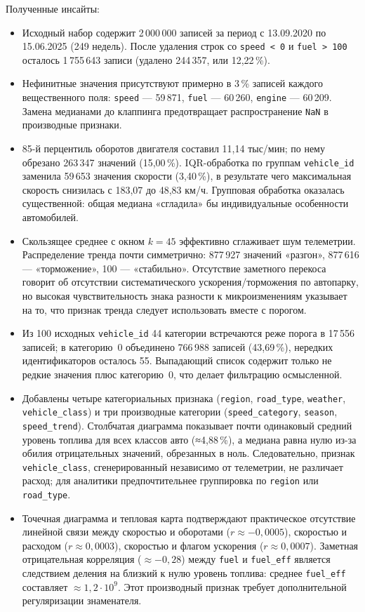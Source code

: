 \documentclass[oneside,a4paper,14pt]{extarticle}
\begin{document}
Полученные инсайты:
\begin{itemize}[leftmargin=*]
	\item Исходный набор содержит 2\,000\,000 записей за период с 13.09.2020 по 15.06.2025 (249 недель). После удаления строк со \texttt{speed < 0} и \texttt{fuel > 100} осталось 1\,755\,643 записи (удалено 244\,357, или 12,22\,\%).
	\item Нефинитные значения присутствуют примерно в 3\,\% записей каждого вещественного поля: \texttt{speed} --- 59\,871, \texttt{fuel} --- 60\,260, \texttt{engine} --- 60\,209. Замена медианами до клаппинга предотвращает распространение \texttt{NaN} в производные признаки.
	\item 85-й перцентиль оборотов двигателя составил 11,14 тыс/мин; по нему обрезано 263\,347 значений (15,00\,\%). IQR-обработка по группам \texttt{vehicle\_id} заменила 59\,653 значения скорости (3,40\,\%), в результате чего максимальная скорость снизилась с 183,07 до 48,83 км/ч. Групповая обработка оказалась существенной: общая медиана «сгладила» бы индивидуальные особенности автомобилей.
	\item Скользящее среднее с окном $k=45$ эффективно сглаживает шум телеметрии. Распределение тренда почти симметрично: 877\,927 значений «разгон», 877\,616 --- «торможение», 100 --- «стабильно». Отсутствие заметного перекоса говорит об отсутствии систематического ускорения/торможения по автопарку, но высокая чувствительность знака разности к микроизменениям указывает на то, что признак тренда следует использовать вместе с порогом.
	\item Из 100 исходных \texttt{vehicle\_id} 44 категории встречаются реже порога в 17\,556 записей; в категорию~0 объединено 766\,988 записей (43,69\,\%), нередких идентификаторов осталось 55. Выпадающий список содержит только не редкие значения плюс категорию~0, что делает фильтрацию осмысленной.
	\item Добавлены четыре категориальных признака (\texttt{region}, \texttt{road\_type}, \texttt{weather}, \texttt{vehicle\_class}) и три производные категории (\texttt{speed\_category}, \texttt{season}, \texttt{speed\_trend}). Столбчатая диаграмма показывает почти одинаковый средний уровень топлива для всех классов авто (≈4,88\,\%), а медиана равна нулю из-за обилия отрицательных значений, обрезанных в ноль. Следовательно, признак \texttt{vehicle\_class}, сгенерированный независимо от телеметрии, не различает расход; для аналитики предпочтительнее группировка по \texttt{region} или \texttt{road\_type}.
	\item Точечная диаграмма и тепловая карта подтверждают практическое отсутствие линейной связи между скоростью и оборотами ($r \approx -0{,}0005$), скоростью и расходом ($r \approx 0{,}0003$), скоростью и флагом ускорения ($r \approx 0{,}0007$). Заметная отрицательная корреляция ($\approx -0{,}28$) между \texttt{fuel} и \texttt{fuel\_eff} является следствием деления на близкий к нулю уровень топлива: среднее \texttt{fuel\_eff} составляет $\approx 1{,}2 \cdot 10^{9}$. Этот производный признак требует дополнительной регуляризации знаменателя.
\end{itemize}
\end{document}
